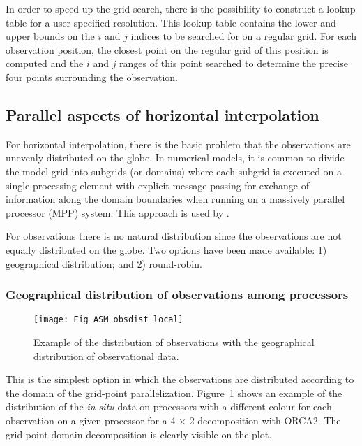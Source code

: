 \documentclass[NEMO_book]{subfiles}
\begin{document}
In order to speed up the grid search, there is the possibility to construct 
a lookup table for a user specified resolution. This lookup
table contains the lower and upper bounds on the $i$ and $j$ indices
to be searched for on a regular grid. For each observation position,
the closest point on the regular grid of this position is computed and
the $i$ and $j$ ranges of this point searched to determine the precise
four points surrounding the observation. 

\subsection{Parallel aspects of horizontal interpolation}
\label{OBS_parallel}

For horizontal interpolation, there is the basic problem that the
observations are unevenly distributed on the globe. In numerical
models, it is common to divide the model grid into subgrids (or
domains) where each subgrid is executed on a single processing element
with explicit message passing for exchange of information along the
domain boundaries when running on a massively parallel processor (MPP)
system. This approach is used by \NEMO.

For observations there is no natural distribution since the
observations are not equally distributed on the globe. 
Two options have been made available: 1) geographical distribution;
and 2) round-robin.

\subsubsection{Geographical distribution of observations among processors}

\begin{figure}      \begin{center}
\texttt{[image: Fig\_ASM\_obsdist\_local]}
\caption{      \label{fig:obslocal}
Example of the distribution of observations with the geographical distribution of observational data.} 
\end{center}      \end{figure}

This is the simplest option in which the observations are distributed according 
to the domain of the grid-point parallelization. Figure~\ref{fig:obslocal}
shows an example of the distribution of the {\em in situ} data on processors 
with a different colour for each observation
on a given processor for a 4 $\times$ 2 decomposition with ORCA2. 
The grid-point domain decomposition is clearly visible on the plot.
\end{document}
